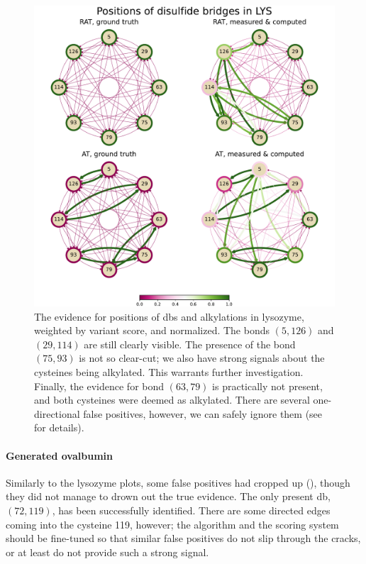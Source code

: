\begin{figure}
  \centering
  \includegraphics[width=0.9\linewidth]{img/lys.pdf}
  \caption{The evidence for positions of \glspl*{db} and alkylations in lysozyme, weighted by variant score, and normalized. The bonds \((5, 126)\) and \((29, 114)\) are still clearly visible. The presence of the bond \((75, 93)\) is not so clear-cut; we also have strong signals about the cysteines being alkylated. This warrants further investigation. Finally, the evidence for bond \((63, 79)\) is practically not present, and both cysteines were deemed as alkylated. There are several one-directional false positives, however, we can safely ignore them (see  for details).}\label{fig:lys}
\end{figure}

\paragraph{Generated ovalbumin} Similarly to the lysozyme plots, some false positives had cropped up (), though they did not manage to drown out the true evidence. The only present \gls*{db}, \((72, 119)\), has been successfully identified. There are some directed edges coming into the cysteine 119, however; the algorithm and the scoring system should be fine-tuned so that similar false positives do not slip through the cracks, or at least do not provide such a strong signal.

